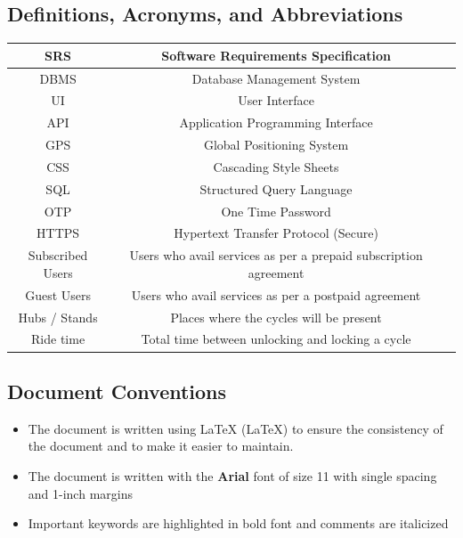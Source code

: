 \documentclass[11pt]{article}
\begin{document}
\subsection{Definitions, Acronyms, and Abbreviations}
\begin{center}
\begin{tabular}{|c|c|p{}}
    \hline
    SRS & Software Requirements Specification \\
    \hline
    DBMS & Database Management System \\
    \hline
    UI & User Interface \\
    \hline
    API & Application Programming Interface \\
    \hline
    GPS & Global Positioning System \\
    \hline
    CSS & Cascading Style Sheets \\
    \hline
    SQL & Structured Query Language \\
    \hline
    OTP & One Time Password \\
    \hline
    HTTPS & Hypertext Transfer Protocol (Secure)\\
    \hline
    Subscribed Users & Users who avail services as per a prepaid subscription agreement \\
    \hline
    Guest Users & Users who avail services as per a postpaid agreement \\
    \hline
    Hubs / Stands & Places where the cycles will be present \\
    \hline
    Ride time & Total time between unlocking and locking a cycle \\
    \hline
\end{tabular}
\end{center}

\subsection{Document Conventions}
\begin{itemize}
    \item The document is written using LaTeX (\LaTeX) to ensure the consistency of the document and to make it easier to maintain.
    \item The document is written with the \textbf{Arial} font of size 11 with single spacing and 1-inch margins
    \item Important keywords are highlighted in bold font and comments are italicized
\end{itemize}
\end{document}
